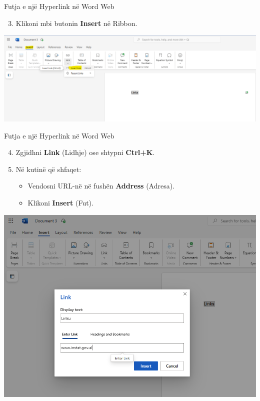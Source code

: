 \documentclass[
  ignorenonframetext,
]{beamer}
\providecommand{\tightlist}{%
  \setlength{\itemsep}{0pt}\setlength{\parskip}{0pt}}
\begin{document}
\begin{frame}{Futja e një Hyperlink në Word Web}
\label{futja-e-njuxeb-hyperlink-nuxeb-word-web-1}
\begin{enumerate}
\setcounter{enumi}{2}
\tightlist
\item
  Klikoni mbi butonin \textbf{Insert} në Ribbon.
\end{enumerate}

\includegraphics{./images/word8.png}
\end{frame}

\begin{frame}{Futja e një Hyperlink në Word Web}
\label{futja-e-njuxeb-hyperlink-nuxeb-word-web-2}
\begin{enumerate}
\setcounter{enumi}{3}
\item
  Zgjidhni \textbf{Link} (Lidhje) ose shtypni \textbf{Ctrl+K}.
\item
  Në kutinë që shfaqet:

  \begin{itemize}
  \item
    Vendosni URL-në në fushën \textbf{Address} (Adresa).
  \item
    Klikoni \textbf{Insert} (Fut).
  \end{itemize}
\end{enumerate}

\includegraphics{./images/word9.png}
\end{frame}
\end{document}

